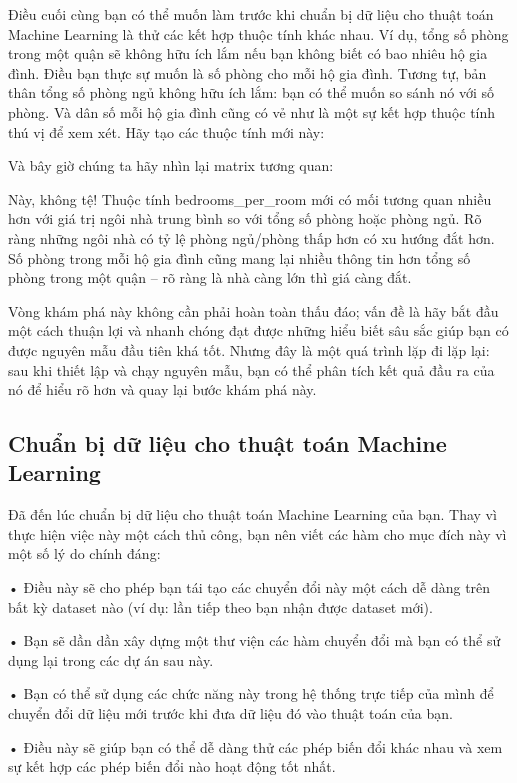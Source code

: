 Điều cuối cùng bạn có thể muốn làm trước khi chuẩn bị dữ liệu cho thuật toán Machine Learning là thử các kết hợp thuộc tính khác nhau. Ví dụ, tổng số phòng trong một quận sẽ không hữu ích lắm nếu bạn không biết có bao nhiêu hộ gia đình. Điều bạn thực sự muốn là số phòng cho mỗi hộ gia đình. Tương tự, bản thân tổng số phòng ngủ không hữu ích lắm: bạn có thể muốn so sánh nó với số phòng. Và dân số mỗi hộ gia đình cũng có vẻ như là một sự kết hợp thuộc tính thú vị để xem xét. Hãy tạo các thuộc tính mới này:

Và bây giờ chúng ta hãy nhìn lại matrix tương quan:

Này, không tệ! Thuộc tính bedrooms\_per\_room mới có mối tương quan nhiều hơn với giá trị ngôi nhà trung bình so với tổng số phòng hoặc phòng ngủ. Rõ ràng những ngôi nhà có tỷ lệ phòng ngủ/phòng thấp hơn có xu hướng đắt hơn. Số phòng trong mỗi hộ gia đình cũng mang lại nhiều thông tin hơn tổng số phòng trong một quận – rõ ràng là nhà càng lớn thì giá càng đắt.

Vòng khám phá này không cần phải hoàn toàn thấu đáo; vấn đề là hãy bắt đầu một cách thuận lợi và nhanh chóng đạt được những hiểu biết sâu sắc giúp bạn có được nguyên mẫu đầu tiên khá tốt. Nhưng đây là một quá trình lặp đi lặp lại: sau khi thiết lập và chạy nguyên mẫu, bạn có thể phân tích kết quả đầu ra của nó để hiểu rõ hơn và quay lại bước khám phá này.

\subsection{Chuẩn bị dữ liệu cho thuật toán Machine Learning}

Đã đến lúc chuẩn bị dữ liệu cho thuật toán Machine Learning của bạn. Thay vì thực hiện việc này một cách thủ công, bạn nên viết các hàm cho mục đích này vì một số lý do chính đáng:

• Điều này sẽ cho phép bạn tái tạo các chuyển đổi này một cách dễ dàng trên bất kỳ dataset nào (ví dụ: lần tiếp theo bạn nhận được dataset mới).

• Bạn sẽ dần dần xây dựng một thư viện các hàm chuyển đổi mà bạn có thể sử dụng lại trong các dự án sau này.

• Bạn có thể sử dụng các chức năng này trong hệ thống trực tiếp của mình để chuyển đổi dữ liệu mới trước khi đưa dữ liệu đó vào thuật toán của bạn.

• Điều này sẽ giúp bạn có thể dễ dàng thử các phép biến đổi khác nhau và xem sự kết hợp các phép biến đổi nào hoạt động tốt nhất.

